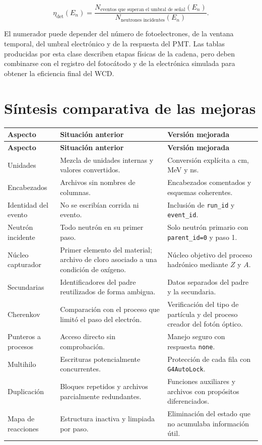 \documentclass[11pt,a4paper]{article}
\newcommand{\codigo}[1]{\nolinkurl{#1}}
\begin{document}
\begin{equation}
\eta_{\mathrm{det}}(E_n)=
\frac{N_{\text{eventos que superan el umbral de señal}}(E_n)}
     {N_{\text{neutrones incidentes}}(E_n)}.
\end{equation}

El numerador puede depender del número de fotoelectrones, de la ventana
temporal, del umbral electrónico y de la respuesta del PMT. Las tablas
producidas por esta clase describen etapas físicas de la cadena, pero deben
combinarse con el registro del fotocátodo y de la electrónica simulada para
obtener la eficiencia final del WCD.

\section{Síntesis comparativa de las mejoras}

\small
\begin{longtable}{>{\raggedright\arraybackslash}p{}
                  >{\raggedright\arraybackslash}p{}
                  >{\raggedright\arraybackslash}p{}}
\toprule
\textbf{Aspecto} & \textbf{Situación anterior} & \textbf{Versión mejorada}\\
\midrule
\endfirsthead
\toprule
\textbf{Aspecto} & \textbf{Situación anterior} & \textbf{Versión mejorada}\\
\midrule
\endhead
Unidades & Mezcla de unidades internas y valores convertidos. & Conversión explícita a cm, MeV y ns.\\
Encabezados & Archivos sin nombres de columnas. & Encabezados comentados y esquemas coherentes.\\
Identidad del evento & No se escribían corrida ni evento. & Inclusión de \codigo{run_id} y \codigo{event_id}.\\
Neutrón incidente & Todo neutrón en su primer paso. & Solo neutrón primario con \codigo{parent_id=0} y paso 1.\\
Núcleo capturador & Primer elemento del material; archivo de cloro asociado a una condición de oxígeno. & Núcleo objetivo del proceso hadrónico mediante $Z$ y $A$.\\
Secundarias & Identificadores del padre reutilizados de forma ambigua. & Datos separados del padre y la secundaria.\\
Cherenkov & Comparación con el proceso que limitó el paso del electrón. & Verificación del tipo de partícula y del proceso creador del fotón óptico.\\
Punteros a procesos & Acceso directo sin comprobación. & Manejo seguro con respuesta \codigo{none}.\\
Multihilo & Escrituras potencialmente concurrentes. & Protección de cada fila con \codigo{G4AutoLock}.\\
Duplicación & Bloques repetidos y archivos parcialmente redundantes. & Funciones auxiliares y archivos con propósitos diferenciados.\\
Mapa de reacciones & Estructura inactiva y limpiada por paso. & Eliminación del estado que no acumulaba información útil.\\
\bottomrule
\end{longtable}
\normalsize
\end{document}

